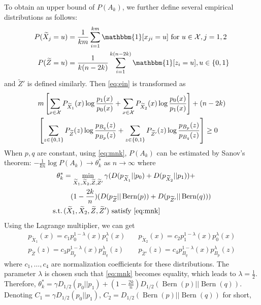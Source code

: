 \documentclass[conference,letterpaper]{IEEEtran}
\DeclareMathOperator{\Bern}{Bern}
\begin{document}
To obtain an upper bound of $P(A_k)$, we further define several empirical distributions as follows:
\begin{align*}
P(\widetilde{X}_j = u) &= \frac{1}{km} \sum_{i=1}^{km} \mathbbm{1}[x_{ji} = u] \textrm{ for } u \in \mathcal{X}, j=1,2 \\
P(\widetilde{Z} = u) &= \frac{1}{k(n-2k)}\sum_{i=1}^{k(n-2k)} \mathbbm{1}[z_i = u], u \in \{0, 1\}
\end{align*}
and $\widetilde{Z}'$ is defined similarly. Then
\eqref{eq:ein} is transformed as
\begin{align}
&m\left[\sum_{x\in \mathcal{X}}P_{\widetilde{X}_1}(x)\log\frac{p_1(x)}{p_0(x)}
+\sum_{x\in \mathcal{X}}P_{\widetilde{X}_2}(x)\log\frac{p_0(x)}{p_1(x)}\right] +(n-2k)\notag \\
&\left[\sum_{z\in\{0,1\}} P_{\widetilde{Z}}(z) \log \frac{p_{B_q}(z)}{p_{B_p}(z)}
+ \sum_{z\in\{0,1\}} P_{\widetilde{Z}'}(z) \log \frac{p_{B_p}(z)}{p_{B_q}(z)}\right] \geq 0 \label{eq:mnk}
\end{align}
When $p,q$ are constant,
using \eqref{eq:mnk}, $P(A_k)$ can be estimated by Sanov's theorem:
$-\frac{1}{kn}\log P(A_k) \to \theta^*_k$ as $n\to \infty$
where 
\begin{align*}
\theta^*_k &= \min_{\widetilde{X}_1, \widetilde{X}_2, \widetilde{Z}, \widetilde{Z}'} \gamma (D(p_{\widetilde{X}_1}||p_0) + D(p_{\widetilde{X}_2}||p_1)) + \\
&\quad (1-\frac{2k}{n})
(D(p_{\widetilde{Z}}||\Bern(p)) + D(p_{\widetilde{Z}'}||\Bern(q)))  \\
\textrm{s.t.} \, & (\widetilde{X}_1, \widetilde{X}_2, \widetilde{Z}, \widetilde{Z}')
\textrm{ satisfy } \eqref{eq:mnk}
\end{align*}
Using the Lagrange multiplier, we can get
\begin{align*}
p_{\widetilde{X}_1}(x) = c_1 p_0^{1-\lambda}(x)p_1^{\lambda}(x)\quad & p_{\widetilde{X}_2}(x) = c_2 p_1^{1-\lambda}(x)p_0^{\lambda}(x) \\
p_{\widetilde{Z}}(z) = c_3 p_{B_p}^{1-\lambda}(x)p_{B_q}^{\lambda}(z)\quad &
p_{\widetilde{Z}'}(z) = c_4 p_{B_q}^{1-\lambda}(x)p_{B_p}^{\lambda}(z)
\end{align*}
where $c_1, \dots, c_4$ are normalization coefficients for these distributions.
The parameter $\lambda$ is chosen such that \eqref{eq:mnk} becomes equality, which leads to $\lambda=\frac{1}{2}$.
Therefore, $\theta^*_k = \gamma D_{1/2}(p_0 || p_1) +(1-\frac{2k}{n}) D_{1/2}(\Bern(p)||\Bern(q))$.
Denoting $C_1=\gamma D_{1/2}(p_0 || p_1)$, $C_2=D_{1/2}(\Bern(p)||\Bern(q))$ for short,
\end{document}
